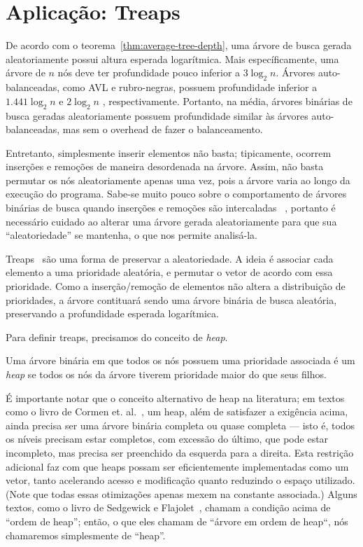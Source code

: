 \section{Aplicação: Treaps}

De acordo com o teorema~\ref{thm:average-tree-depth},
uma árvore de busca gerada aleatoriamente
possui altura esperada logarítmica.
Mais específicamente,
uma árvore de $n$ nós
deve ter profundidade pouco inferior a $3 \log_2 n$.
Árvores auto-balanceadas,
como AVL e rubro-negras,
possuem profundidade inferior a $1.441 \log_2 n$ \cite[p.~460]{Knuth1998}
e $2 \log_2 n$ \cite[p.~309]{CormenLeisersonRivestStein2009},
respectivamente.
Portanto,
na média,
árvores binárias de busca geradas aleatoriamente
possuem profundidade similar às árvores auto-balanceadas,
mas sem o overhead de fazer o balanceamento.

Entretanto,
simplesmente inserir elementos não basta;
tipicamente, ocorrem inserções e remoções de maneira desordenada na árvore.
Assim,
não basta permutar os nós aleatoriamente apenas uma vez,
pois a árvore varia ao longo da execução do programa.
Sabe-se muito pouco sobre o comportamento de árvores binárias de busca
quando inserções e remoções são intercaladas%
~\cite[p.~300]{CormenLeisersonRivestStein2009},
portanto é necessário cuidado ao alterar uma árvore gerada aleatoriamente
para que sua ``aleatoriedade'' se mantenha,
o que nos permite analisá-la.

Treaps~\cite{AragonSeidel1989} são uma forma de preservar a aleatoriedade.
A ideia é associar cada elemento a uma prioridade aleatória,
e permutar o vetor de acordo com essa prioridade.
Como a inserção/remoção de elementos
não altera a distribuição de prioridades,
a árvore contituará sendo uma árvore binária de busca aleatória,
preservando a profundidade esperada logarítmica.

Para definir treaps, precisamos do conceito de \emph{heap}.

\begin{definition}
    Uma árvore binária em que todos os nós possuem uma prioridade associada
    é um \emph{heap}
    se todos os nós da árvore tiverem prioridade maior do que seus filhos.
\end{definition}

É importante notar que o conceito alternativo de heap na literatura;
em textos como o livro de Cormen et. al.~\cite[p.~152]{CormenLeisersonRivestStein2009},
um heap, além de satisfazer a exigência acima,
ainda precisa ser uma árvore binária completa ou quase completa
--- isto é, todos os níveis precisam estar completos,
com excessão do último, que pode estar incompleto,
mas precisa ser preenchido da esquerda para a direita.
Esta restrição adicional
faz com que heaps possam ser eficientemente implementadas como um vetor,
tanto acelerando acesso e modificação quanto reduzindo o espaço utilizado.
(Note que todas essas otimizações apenas mexem na constante associada.)
Alguns textos, como o livro de Sedgewick e Flajolet~\cite[p.~362]{SedgewickFlajolet2013},
chamam a condição acima de ``ordem de heap'';
então, o que eles chamam de ``árvore em ordem de heap``,
nós chamaremos simplesmente de ``heap''.


